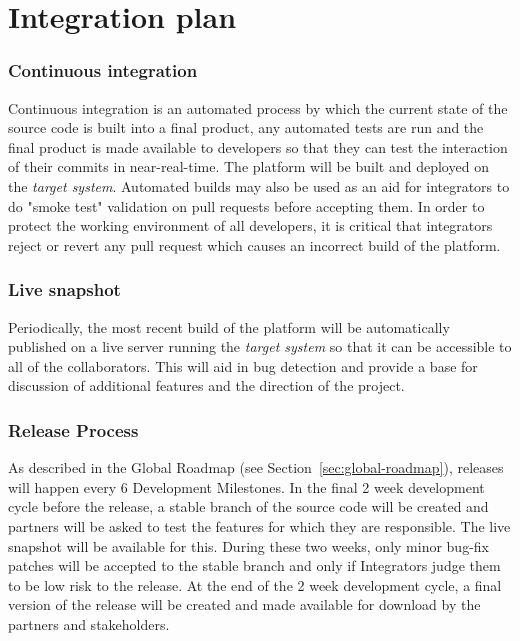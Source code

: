 \chapter{Integration plan}
\label{ch:integration-plan}

\subsection{Continuous integration}
\label{sec:continuous-integration}

Continuous integration is an automated process by which the current state of the source code is
built into a final product, any automated tests are run and the final product is made available
to developers so that they can test the interaction of their commits in near-real-time. The platform
will be built and deployed on the \emph{target system}.
Automated builds may also be used as an aid for integrators to do "smoke test" validation on pull
requests before accepting them. In order to protect the working environment of all developers,
it is critical that integrators reject or revert any pull request which causes an incorrect build
of the platform.

\subsection{Live snapshot}
\label{sec:live-snapshot}

Periodically, the most recent build of the \learnpad platform will be automatically published
on a live server running the \emph{target system} so that it can be accessible to all of the
collaborators. This will aid in bug detection and provide a base for discussion of additional
features and the direction of the project.

\subsection{Release Process}
\label{sec:release-process}

As described in the Global Roadmap (see Section~\ref{sec:global-roadmap}), releases will happen
every 6 Development Milestones. In the final 2 week development cycle before the release, a stable
branch of the source code will be created and partners will be asked to test the features for
which they are responsible. The live snapshot will be available for this. During these two weeks,
only minor bug-fix patches will be accepted to the stable branch and only if Integrators judge them
to be low risk to the release. At the end of the 2 week development cycle, a final version of the
release will be created and made available for download by the partners and stakeholders.
